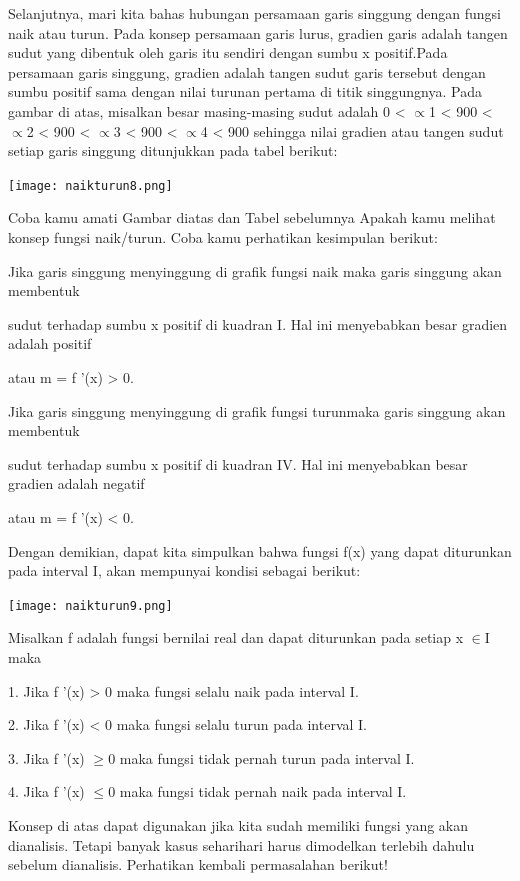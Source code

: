 \documentclass[11pt,fleqn]{book} %
\begin{document}
Selanjutnya, mari kita bahas hubungan persamaan garis singgung dengan fungsi naik atau turun. Pada konsep
persamaan garis lurus, gradien garis adalah tangen sudut yang dibentuk oleh garis itu sendiri dengan sumbu x positif.Pada persamaan garis singgung, gradien adalah tangen sudut garis tersebut dengan sumbu positif sama dengan nilai turunan pertama di titik singgungnya. Pada gambar di atas, misalkan besar masing-masing sudut adalah 0 < $\propto $1 < 900 < $\propto $2 < 900 < $\propto $3 < 900 < $\propto $4 < 900 sehingga nilai
gradien atau tangen sudut setiap garis singgung ditunjukkan pada tabel berikut:

\begin{center}
\texttt{[image: naikturun8.png]}
\end{center}

Coba kamu amati Gambar diatas dan Tabel sebelumnya Apakah kamu melihat konsep fungsi naik/turun. Coba kamu perhatikan kesimpulan berikut:

Jika garis singgung menyinggung di grafik fungsi naik maka garis singgung akan membentuk 

sudut terhadap sumbu x positif di kuadran I. Hal ini menyebabkan besar gradien adalah positif 

atau m = f '(x) > 0.

Jika garis singgung menyinggung di grafik fungsi turunmaka garis singgung akan membentuk 

sudut terhadap sumbu x positif di kuadran IV. Hal ini menyebabkan besar gradien adalah negatif 

atau m = f '(x) < 0.

Dengan demikian, dapat kita simpulkan bahwa fungsi f(x) yang dapat diturunkan pada interval I, akan mempunyai kondisi sebagai berikut:

\begin{center}
\texttt{[image: naikturun9.png]}
\end{center}

Misalkan f adalah fungsi bernilai real dan dapat
diturunkan pada setiap x $\in $I maka

1. Jika f '(x) > 0 maka fungsi selalu naik pada interval I.

2. Jika f '(x) < 0 maka fungsi selalu turun pada interval I.

3. Jika f '(x) $\geqslant $0 maka fungsi tidak pernah turun pada interval I.

4. Jika f '(x) $\leqslant $0 maka fungsi tidak pernah naik pada interval I.

Konsep di atas dapat digunakan jika kita sudah memiliki fungsi yang akan dianalisis. Tetapi banyak kasus seharihari harus dimodelkan terlebih dahulu sebelum dianalisis. Perhatikan kembali permasalahan berikut!\\
\end{document}

